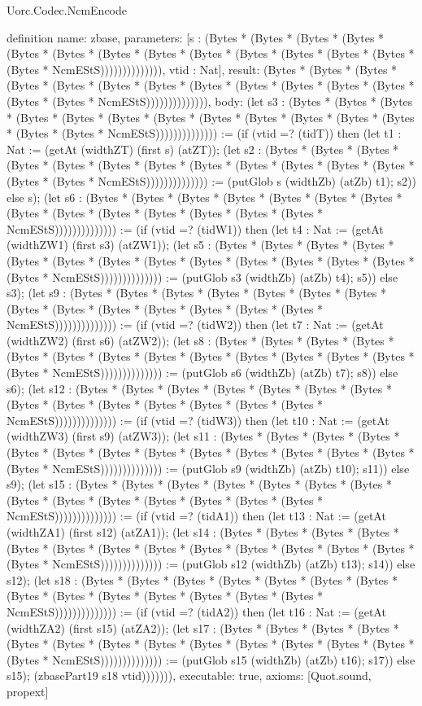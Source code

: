 \begin{lexlean}{Uorc.Codec.NcmEncode}
\begin{semanticmodule}
definition{
  name: zbase,
  parameters: [s : (Bytes * (Bytes * (Bytes * (Bytes * (Bytes * (Bytes * (Bytes * (Bytes * (Bytes * (Bytes * (Bytes * (Bytes * (Bytes * (Bytes * NcmEStS)))))))))))))), vtid : Nat],
  result: (Bytes * (Bytes * (Bytes * (Bytes * (Bytes * (Bytes * (Bytes * (Bytes * (Bytes * (Bytes * (Bytes * (Bytes * (Bytes * (Bytes * NcmEStS)))))))))))))),
  body: (let s3 : (Bytes * (Bytes * (Bytes * (Bytes * (Bytes * (Bytes * (Bytes * (Bytes * (Bytes * (Bytes * (Bytes * (Bytes * (Bytes * (Bytes * NcmEStS)))))))))))))) := (if (vtid =? (tidT)) then (let t1 : Nat := (getAt (widthZT) (first s) (atZT)); (let s2 : (Bytes * (Bytes * (Bytes * (Bytes * (Bytes * (Bytes * (Bytes * (Bytes * (Bytes * (Bytes * (Bytes * (Bytes * (Bytes * (Bytes * NcmEStS)))))))))))))) := (putGlob s (widthZb) (atZb) t1); s2)) else s); (let s6 : (Bytes * (Bytes * (Bytes * (Bytes * (Bytes * (Bytes * (Bytes * (Bytes * (Bytes * (Bytes * (Bytes * (Bytes * (Bytes * (Bytes * NcmEStS)))))))))))))) := (if (vtid =? (tidW1)) then (let t4 : Nat := (getAt (widthZW1) (first s3) (atZW1)); (let s5 : (Bytes * (Bytes * (Bytes * (Bytes * (Bytes * (Bytes * (Bytes * (Bytes * (Bytes * (Bytes * (Bytes * (Bytes * (Bytes * (Bytes * NcmEStS)))))))))))))) := (putGlob s3 (widthZb) (atZb) t4); s5)) else s3); (let s9 : (Bytes * (Bytes * (Bytes * (Bytes * (Bytes * (Bytes * (Bytes * (Bytes * (Bytes * (Bytes * (Bytes * (Bytes * (Bytes * (Bytes * NcmEStS)))))))))))))) := (if (vtid =? (tidW2)) then (let t7 : Nat := (getAt (widthZW2) (first s6) (atZW2)); (let s8 : (Bytes * (Bytes * (Bytes * (Bytes * (Bytes * (Bytes * (Bytes * (Bytes * (Bytes * (Bytes * (Bytes * (Bytes * (Bytes * (Bytes * NcmEStS)))))))))))))) := (putGlob s6 (widthZb) (atZb) t7); s8)) else s6); (let s12 : (Bytes * (Bytes * (Bytes * (Bytes * (Bytes * (Bytes * (Bytes * (Bytes * (Bytes * (Bytes * (Bytes * (Bytes * (Bytes * (Bytes * NcmEStS)))))))))))))) := (if (vtid =? (tidW3)) then (let t10 : Nat := (getAt (widthZW3) (first s9) (atZW3)); (let s11 : (Bytes * (Bytes * (Bytes * (Bytes * (Bytes * (Bytes * (Bytes * (Bytes * (Bytes * (Bytes * (Bytes * (Bytes * (Bytes * (Bytes * NcmEStS)))))))))))))) := (putGlob s9 (widthZb) (atZb) t10); s11)) else s9); (let s15 : (Bytes * (Bytes * (Bytes * (Bytes * (Bytes * (Bytes * (Bytes * (Bytes * (Bytes * (Bytes * (Bytes * (Bytes * (Bytes * (Bytes * NcmEStS)))))))))))))) := (if (vtid =? (tidA1)) then (let t13 : Nat := (getAt (widthZA1) (first s12) (atZA1)); (let s14 : (Bytes * (Bytes * (Bytes * (Bytes * (Bytes * (Bytes * (Bytes * (Bytes * (Bytes * (Bytes * (Bytes * (Bytes * (Bytes * (Bytes * NcmEStS)))))))))))))) := (putGlob s12 (widthZb) (atZb) t13); s14)) else s12); (let s18 : (Bytes * (Bytes * (Bytes * (Bytes * (Bytes * (Bytes * (Bytes * (Bytes * (Bytes * (Bytes * (Bytes * (Bytes * (Bytes * (Bytes * NcmEStS)))))))))))))) := (if (vtid =? (tidA2)) then (let t16 : Nat := (getAt (widthZA2) (first s15) (atZA2)); (let s17 : (Bytes * (Bytes * (Bytes * (Bytes * (Bytes * (Bytes * (Bytes * (Bytes * (Bytes * (Bytes * (Bytes * (Bytes * (Bytes * (Bytes * NcmEStS)))))))))))))) := (putGlob s15 (widthZb) (atZb) t16); s17)) else s15); (zbasePart19 s18 vtid))))))),
  executable: true,
  axioms: [Quot.sound, propext]
}


\end{semanticmodule}
\end{lexlean}
